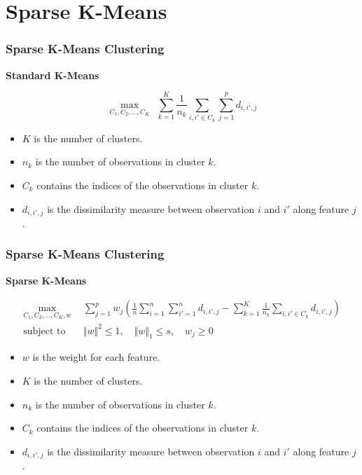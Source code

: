 \documentclass{beamer}
\begin{document}
\section{Sparse K-Means}
\begin{frame}
\frametitle{Sparse K-Means Clustering}
{\Large \bf Standard K-Means}

\begin{equation*}
\max_{C_1,C_2,\ldots,C_K} ~~ \sum_{k=1}^K \frac{1}{n_k} \sum_{i,i' \in C_k} \sum_{j=1}^p d_{i,i',j}
\end{equation*}

\begin{itemize}
    \item $K$ is the number of clusters.
    \item $n_k$ is the number of observations in cluster $k$.
    \item $C_k$ contains the indices of the observations in cluster $k$.
    \item $d_{i,i',j}$ is the dissimilarity measure between observation $i$ and $i'$ along feature $j$.
\end{itemize}

\end{frame}
\begin{frame}
\frametitle{Sparse K-Means Clustering}
{\Large \bf Sparse K-Means}

\begin{eqnarray*}
\max_{C_1,C_2,\ldots,C_K,w} ~&~ \sum_{j=1}^p w_j(\frac{1}{n} \sum_{i=1}^n \sum_{i'=1}^n d_{i,i',j} - \sum_{k=1}^K \frac{1}{n_k} \sum_{i,i' \in C_k} d_{i,i',j} ) \\
\text{subject to } ~&~ \Vert w \Vert^2 \le 1, \quad \Vert w \Vert_1 \le s, \quad w_j \ge 0
\end{eqnarray*}
\begin{itemize}
    \item $w$ is the weight for each feature.
    \item $K$ is the number of clusters.
    \item $n_k$ is the number of observations in cluster $k$.
    \item $C_k$ contains the indices of the observations in cluster $k$.
    \item $d_{i,i',j}$ is the dissimilarity measure between observation $i$ and $i'$ along feature $j$.
\end{itemize}
\end{frame}
\end{document}
